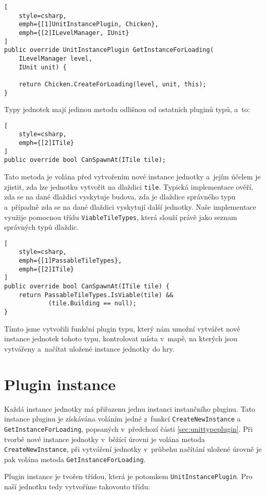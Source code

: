 \begin{lstlisting}[
	style=csharp,
	emph={[1]UnitInstancePlugin, Chicken},
	emph={[2]ILevelManager, IUnit}
]
public override UnitInstancePlugin GetInstanceForLoading(
	ILevelManager level, 
	IUnit unit) {
	
	return Chicken.CreateForLoading(level, unit, this);
}
\end{lstlisting}

Typy jednotek mají jedinou metodu odlišnou od ostatních pluginů typů, a~to:


\begin{lstlisting}[
	style=csharp,
	emph={[2]ITile}
]
public override bool CanSpawnAt(ITile tile);
\end{lstlisting}

Tato metoda je volána před vytvořením nové instance jednotky a~jejím účelem je zjistit, zda lze jednotku vytvořit na dlaždici \texttt{tile}. Typická implementace ověří, zda se na dané dlaždici vyskytuje budova, zda je dlaždice správného typu a~případně zda se na dané dlaždici vyskytují další jednotky. Naše implementace využije pomocnou třídu \texttt{ViableTileTypes}, která slouží právě jako seznam správných typů dlaždic.

\begin{lstlisting}[
	style=csharp,
	emph={[1]PassableTileTypes},
	emph={[2]ITile}
]
public override bool CanSpawnAt(ITile tile) {
	return PassableTileTypes.IsViable(tile) && 
			(tile.Building == null);
}
\end{lstlisting}

Tímto jsme vytvořili funkční plugin typu, který nám umožní vytvářet nové instance jednotek tohoto typu, kontrolovat místa v~mapě, na kterých jsou vytvářeny a~načítat uložené instance jednotky do hry.

\section{Plugin instance}
\label{sec:unitinstanceplugin}

Každá instance jednotky má přiřazenu jednu instanci instančního pluginu. Tato instance pluginu je získávána voláním jedné z~funkcí \texttt{CreateNewInstance} a \texttt{GetInstanceForLoading}, popsaných v~předchozí části \ref{sec:unittypeplugin}. Při tvorbě nové instance jednotky v~běžící úrovni je volána metoda \texttt{CreateNewInstance}, při vytváření jednotky v~průbehu načítání uložené úrovně je pak volána metoda \texttt{GetInstanceForLoading}.

Plugin instance je tvořen třídou, která je potomkem \texttt{UnitInstancePlugin}. Pro naší jednotku tedy vytvoříme takovouto třídu:

